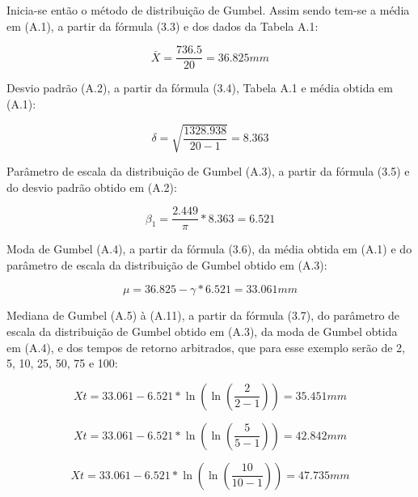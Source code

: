 Inicia-se então o método de distribuição de Gumbel. Assim sendo tem-se a média em (A.1), a partir da fórmula (3.3) e dos dados da Tabela A.1:\bigskip

\begin{equation}
\bar{X} = \frac{736.5}{20} = 36.825 mm
\end{equation}\bigskip

\newpage
 
Desvio padrão (A.2), a partir da fórmula (3.4), Tabela A.1 e média obtida em (A.1):\bigskip

\begin{equation}
\delta = \sqrt{\frac{1328.938}{20 - 1}} = 8.363
\end{equation}\bigskip

Parâmetro de escala da distribuição de Gumbel (A.3), a partir da fórmula (3.5) e do desvio padrão obtido em (A.2):\bigskip

\begin{equation}
\beta_1 = \frac{2.449}{\pi} * 8.363 = 6.521
\end{equation}\bigskip

Moda de Gumbel (A.4), a partir da fórmula (3.6), da média obtida em (A.1) e do parâmetro de escala da distribuição de Gumbel obtido em (A.3):\bigskip

\begin{equation}
\mu = 36.825 - \gamma * 6.521 = 33.061 mm
\end{equation}\bigskip

Mediana de Gumbel (A.5) à (A.11), a partir da fórmula (3.7), do parâmetro de escala da distribuição de Gumbel obtido em (A.3), da moda de Gumbel obtida em (A.4), e dos tempos de retorno arbitrados, que para esse exemplo serão de 2, 5, 10, 25, 50, 75 e 100:\bigskip

\begin{equation}
Xt = 33.061 - 6.521 * \ln{\left(\ln{\left(\frac{2}{2 - 1}\right)}\right)} = 35.451 mm
\end{equation}

\begin{equation}
Xt = 33.061 - 6.521 * \ln{\left(\ln{\left(\frac{5}{5 - 1}\right)}\right)} = 42.842 mm
\end{equation}

\begin{equation}
Xt = 33.061 - 6.521 * \ln{\left(\ln{\left(\frac{10}{10 - 1}\right)}\right)} = 47.735 mm
\end{equation}

